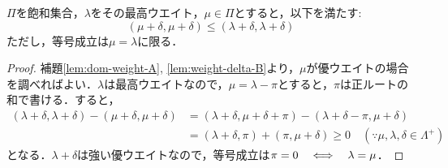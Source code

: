\documentclass[rep_main]{subfiles}
\begin{document}
\begin{mylem}[label=lem:weight-saturated-C]{}
	$\Pi$を飽和集合，$\lambda$をその最高ウエイト，$\mu \in \Pi$とすると，以下を満たす:
	\begin{equation}
		(\mu + \delta, \mu + \delta) \leq (\lambda + \delta, \lambda + \delta) \label{eq:weight-delta-B}
	\end{equation}
	ただし，等号成立は$\mu = \lambda$に限る．
\end{mylem}
\begin{proof}
	補題\ref{lem:dom-weight-A}, \ref{lem:weight-delta-B}より，$\mu$が優ウエイトの場合を調べればよい．$\lambda$は最高ウエイトなので，$\mu = \lambda - \pi$とすると，$\pi$は正ルートの和で書ける．すると，
	\begin{align}
		(\lambda + \delta, \lambda + \delta) - (\mu + \delta, \mu + \delta) &= (\lambda + \delta, \mu + \delta + \pi) - (\lambda + \delta - \pi, \mu + \delta) \\
		&= (\lambda + \delta, \pi) + (\pi, \mu + \delta) \geq 0\quad  (\because \mu, \lambda, \delta \in \Lambda^+)
	\end{align}
	となる．$\lambda + \delta$は強い優ウエイトなので，等号成立は$\pi = 0  \quad \Longleftrightarrow \quad  \lambda = \mu$．
\end{proof}
\end{document}
